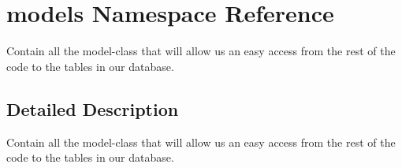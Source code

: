 \hypertarget{namespacemodels}{\section{models Namespace Reference}
\label{namespacemodels}
}


Contain all the model-\/class that will allow us an easy access from the rest of the code to the tables in our database.  




\subsection{Detailed Description}
Contain all the model-\/class that will allow us an easy access from the rest of the code to the tables in our database. 